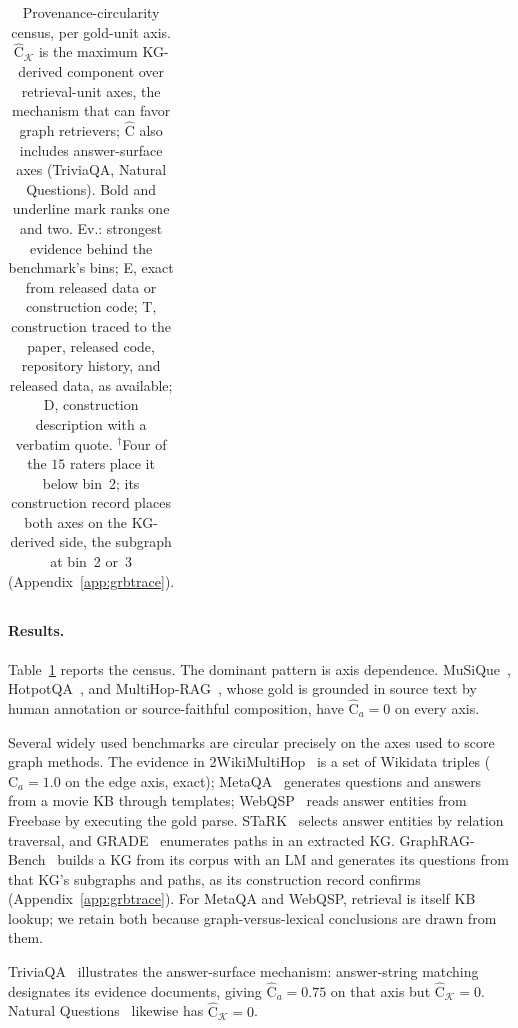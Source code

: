 \documentclass[11pt]{article}
\newcommand{\C}{\mathrm{C}}
\newcommand{\Chat}{\widehat{\mathrm{C}}}
\newcommand{\kg}{\mathcal{K}}
\begin{document}
\begin{table}[t]
{\begin{tabular}{llccc}
\bottomrule
\end{tabular}}
\caption{Provenance-circularity census, per gold-unit axis. $\Chat_{\kg}$ is the maximum KG-derived component over retrieval-unit axes, the mechanism that can favor graph retrievers; $\Chat$ also includes answer-surface axes (TriviaQA, Natural Questions). Bold and underline mark ranks one and two. Ev.: strongest evidence behind the benchmark's bins; E, exact from released data or construction code; T, construction traced to the paper, released code, repository history, and released data, as available; D, construction description with a verbatim quote. $^{\dagger}$Four of the $15$ raters place it below bin~2; its construction record places both axes on the KG-derived side, the subgraph at bin~2 or~3 (Appendix~\ref{app:grbtrace}).}
\label{tab:census}
\end{table}

\paragraph{Results.} Table~\ref{tab:census} reports the census. The dominant pattern is axis dependence. MuSiQue~\citep{trivedi2022musique}, HotpotQA~\citep{yang2018hotpotqa}, and MultiHop-RAG~\citep{tang2024multihoprag}, whose gold is grounded in source text by human annotation or source-faithful composition, have $\Chat_a=0$ on every axis.

Several widely used benchmarks are circular precisely on the axes used to score graph methods. The evidence in 2WikiMultiHop~\citep{ho2020twowiki} is a set of Wikidata triples ($\C_a=1.0$ on the edge axis, exact); MetaQA~\citep{zhang2018metaqa} generates questions and answers from a movie KB through templates; WebQSP~\citep{yih2016webqsp} reads answer entities from Freebase by executing the gold parse. STaRK~\citep{wu2024stark} selects answer entities by relation traversal, and GRADE~\citep{lee2025grade} enumerates paths in an extracted KG. GraphRAG-Bench~\citep{graphragbench2025} builds a KG from its corpus with an LM and generates its questions from that KG's subgraphs and paths, as its construction record confirms (Appendix~\ref{app:grbtrace}). For MetaQA and WebQSP, retrieval is itself KB lookup; we retain both because graph-versus-lexical conclusions are drawn from them.

TriviaQA~\citep{joshi2017triviaqa} illustrates the answer-surface mechanism: answer-string matching designates its evidence documents, giving $\Chat_a=0.75$ on that axis but $\Chat_{\kg}=0$. Natural Questions~\citep{kwiatkowski2019nq} likewise has $\Chat_{\kg}=0$.
\end{document}
